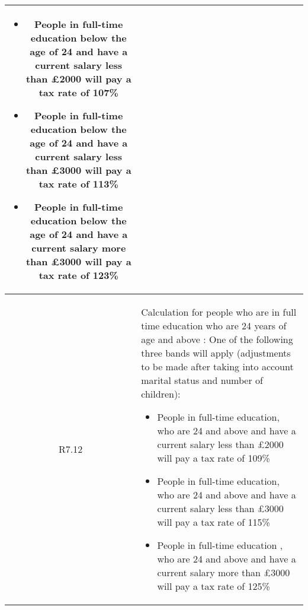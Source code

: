 \begin{table}[H]
\begin{tabularx}{\textwidth}{| c | X |}
	\begin{itemize}[itemsep=\tableitemsep, leftmargin=\tableleftsep]
		\item People in full-time education below the age of 24 and have a current salary less than £2000 will pay a tax rate of 107\%
		\item People in full-time education below the age of 24 and have a current salary less than £3000 will pay a tax rate of 113\%
		\item People in full-time education below the age of 24 and have a current salary more than £3000 will pay a tax rate of 123\%
	\end{itemize}
	\\
	\hline %
	R7.12 & Calculation for people who are in full time education who are 24 years of age and above : One of the following three bands will apply (adjustments to be made after taking into account marital status and number of children):
	\begin{itemize}[itemsep=\tableitemsep, leftmargin=\tableleftsep]
	\item People in full-time education, who are 24 and above and have a current salary less than £2000 will pay a tax rate of 109\%
	\item People in full-time education, who are 24 and above and have a current salary less than £3000 will pay a tax rate of 115\%
	\item People in full-time education , who are 24 and above and have a current salary more than £3000 will pay a tax rate of 125\%
	\end{itemize}
	\\
	\hline %
\end{tabularx}
\end{table}
